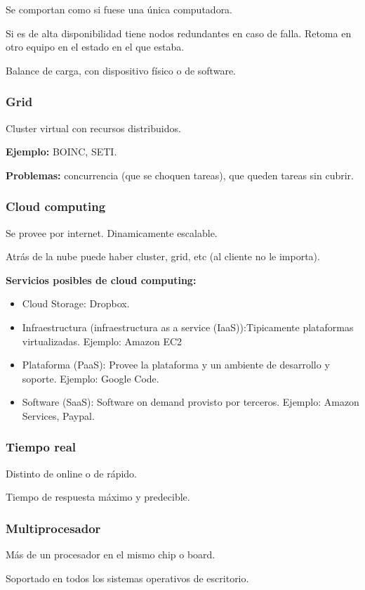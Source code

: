 \documentclass[a4paper, twoside]{article}
\begin{document}
Se comportan como si fuese una única computadora.

Si es de alta disponibilidad tiene nodos redundantes en caso de falla. Retoma en otro equipo en el estado en el que estaba. 

Balance de carga, con dispositivo físico o de software.

\subsubsection{Grid}
Cluster virtual con recursos distribuidos.

\textbf{Ejemplo:} BOINC, SETI.

\textbf{Problemas:} concurrencia (que se choquen tareas), que queden tareas sin cubrir.

\subsubsection{Cloud computing}
Se provee por internet. Dinamicamente escalable.

Atrás de la nube puede haber cluster, grid, etc (al cliente no le importa).

\textbf{Servicios posibles de cloud computing:}
\begin{itemize}
	\item Cloud Storage: Dropbox.
	\item Infraestructura (infraestructura as a service (IaaS)):Tipicamente plataformas virtualizadas. Ejemplo: Amazon EC2
	\item Plataforma (PaaS): Provee la plataforma y un ambiente de desarrollo y soporte. Ejemplo: Google Code.
	\item Software (SaaS): Software on demand provisto por terceros. Ejemplo: Amazon Services, Paypal. 
\end{itemize}

\subsubsection{Tiempo real}
Distinto de online o de rápido.

Tiempo de respuesta máximo y predecible.

\subsubsection{Multiprocesador}
Más de un procesador en el mismo chip o board.

Soportado en todos los sistemas operativos de escritorio.
\end{document}
